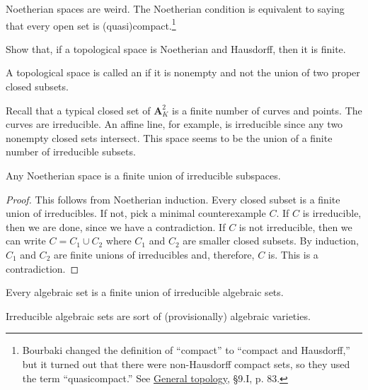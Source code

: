 \documentclass [11 pt, oneside] {article}
\begin{document}
Noetherian spaces are weird. The Noetherian condition is equivalent to saying that every open set is (quasi)compact.\footnote{Bourbaki changed the definition of ``compact'' to ``compact and Hausdorff,'' but it turned out that there were non-Hausdorff compact sets, so they used the term ``quasicompact.'' {See \ul{General topology}, \S 9.I, p. 83.}}

\begin{exercise}\label{}
Show that, if a topological space is Noetherian and Hausdorff, then it is finite.
\end{exercise}

\begin{definition}[ ]\label{}
A topological space is called an  if it is nonempty and not the union of two proper closed subsets.
\end{definition}

Recall that a typical closed set of $\mathbf{A}^2_K$ is a finite number of curves and points. The curves are irreducible. An affine line, for example, is irreducible since any two nonempty closed sets intersect. This space seems to be the union of a finite number of irreducible subsets.

\begin{theorem}[ ]\label{}\index{}
Any Noetherian space is a finite union of irreducible subspaces.
\end{theorem}

\begin{proof}
This follows from Noetherian induction. Every closed subset is a finite union of irreducibles. If not, pick a minimal counterexample $C$. If $C$ is irreducible, then we are done, since we have a contradiction. If $C$ is not irreducible, then we can write $C=C_1\cup C_2$ where $C_1$ and $C_2$ are smaller closed subsets. By induction, $C_1$ and $C_2$ are finite unions of irreducibles and, therefore, $C$ is. This is a contradiction. 
\end{proof}

\begin{corollary}[ ]\label{}
Every algebraic set is a finite union of irreducible algebraic sets.
\end{corollary}

\begin{remark}
	Irreducible algebraic sets are sort of (provisionally) algebraic varieties.
\end{remark}
\end{document}
